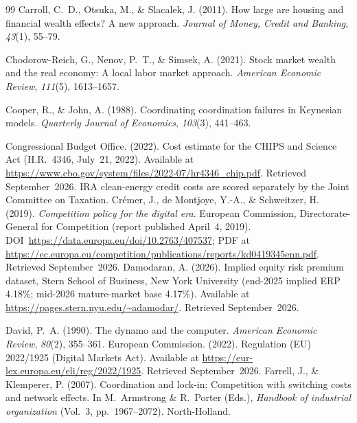 \documentclass[11pt,a4paper]{article}
\begin{document}
\begin{thebibliography}{99}
Carroll, C.~D., Otsuka, M., \& Slacalek, J. (2011).
How large are housing and financial wealth effects? A new approach.
\emph{Journal of Money, Credit and Banking}, \emph{43}(1), 55--79.

Chodorow-Reich, G., Nenov, P.~T., \& Simsek, A. (2021).
Stock market wealth and the real economy: A local labor market approach.
\emph{American Economic Review}, \emph{111}(5), 1613--1657.

Cooper, R., \& John, A. (1988).
Coordinating coordination failures in Keynesian models.
\emph{Quarterly Journal of Economics}, \emph{103}(3), 441--463.

Congressional Budget Office. (2022).
Cost estimate for the CHIPS and Science Act (H.R.~4346, July~21, 2022).
Available at \url{https://www.cbo.gov/system/files/2022-07/hr4346_chip.pdf}.
Retrieved September~2026. IRA clean-energy credit costs are scored
separately by the Joint Committee on Taxation.
Cr\'emer, J., de Montjoye, Y.-A., \& Schweitzer, H. (2019).
\emph{Competition policy for the digital era}.
European Commission, Directorate-General for Competition (report published
April~4, 2019). DOI~\url{https://data.europa.eu/doi/10.2763/407537};
PDF at \url{https://ec.europa.eu/competition/publications/reports/kd0419345enn.pdf}.
Retrieved September~2026.
Damodaran, A. (2026).
Implied equity risk premium dataset, Stern School of Business,
New York University (end-2025 implied ERP 4.18\%; mid-2026 mature-market
base 4.17\%).
Available at \url{https://pages.stern.nyu.edu/~adamodar/}.
Retrieved September~2026.

David, P.~A. (1990).
The dynamo and the computer.
\emph{American Economic Review}, \emph{80}(2), 355--361.
European Commission. (2022).
Regulation (EU) 2022/1925 (Digital Markets Act).
Available at \url{https://eur-lex.europa.eu/eli/reg/2022/1925}.
Retrieved September~2026.
Farrell, J., \& Klemperer, P. (2007).
Coordination and lock-in: Competition with switching costs and network effects.
In M.~Armstrong \& R.~Porter (Eds.),
\emph{Handbook of industrial organization} (Vol.~3, pp.~1967--2072).
North-Holland.


\end{thebibliography}
\end{document}
